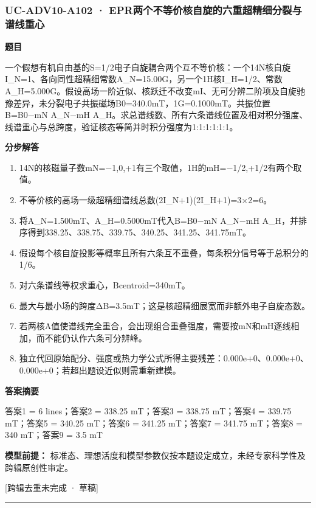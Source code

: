 \documentclass[UTF8,11pt,a4paper]{ctexart}
\begin{document}
\subsubsection*{UC-ADV10-A102 · EPR两个不等价核自旋的六重超精细分裂与谱线重心}
\noindent\textbf{题目}\par
一个假想有机自由基的S=1/2电子自旋耦合两个互不等价核：一个14N核自旋I\_N=1、各向同性超精细常数A\_N=15.00G，另一个1H核I\_H=1/2、常数A\_H=5.000G。假设高场一阶近似、核跃迁不改变mI、无可分辨二阶项及自旋驰豫差异，未分裂电子共振磁场B0=340.0mT，1G=0.1000mT。共振位置B=B0−mN A\_N−mH A\_H。求总谱线数、所有六条谱线位置及相对积分强度、线谱重心与总跨度，验证核态等简并时积分强度为1:1:1:1:1:1。\par
\medskip\noindent\textbf{分步解答}
\begin{enumerate}
\item 14N的核磁量子数mN=−1,0,+1有三个取值，1H的mH=−1/2,+1/2有两个取值。
\item 不等价核的高场一级超精细谱线总数(2I\_N+1)(2I\_H+1)=3×2=6。
\item 将A\_N=1.500mT、A\_H=0.5000mT代入B=B0−mN A\_N−mH A\_H，并排序得到338.25、338.75、339.75、340.25、341.25、341.75mT。
\item 假设每个核自旋投影等概率且所有六条互不重叠，每条积分信号等于总积分的1/6。
\item 对六条谱线等权求重心，Bcentroid=340mT。
\item 最大与最小场的跨度ΔB=3.5mT；这是核超精细展宽而非额外电子自旋态数。
\item 若两核A值使谱线完全重合，会出现组合重叠强度，需要按mN和mH逐线相加，而不能仍认作六条可分辨峰。
\item 独立代回原始配分、强度或热力学公式所得主要残差：0.000e+0、0.000e+0、0.000e+0；若超出题设近似则需重新建模。
\end{enumerate}
\noindent\textbf{答案摘要}\par
答案1 = 6 lines；答案2 = 338.25 mT；答案3 = 338.75 mT；答案4 = 339.75 mT；答案5 = 340.25 mT；答案6 = 341.25 mT；答案7 = 341.75 mT；答案8 = 340 mT；答案9 = 3.5 mT\par
\noindent\textbf{模型前提：}
标准态、理想活度和模型参数仅按本题设定成立，未经专家科学性及跨辑原创性审定。\par
\noindent\textcolor{red!65!black}{[跨辑去重未完成 · 草稿]} \par
\medskip\hrule\medskip
{}
\end{document}
